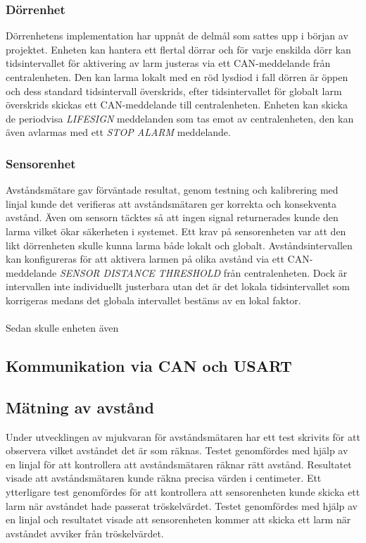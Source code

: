 \documentclass{article}
\begin{document}
\subsubsection{Dörrenhet}
Dörrenhetens implementation har uppnåt de delmål som sattes upp i början av projektet. Enheten kan hantera ett flertal dörrar och för varje enskilda dörr kan tidsintervallet för aktivering av larm justeras via ett CAN-meddelande från centralenheten. Den kan larma lokalt med en röd lysdiod i fall dörren är öppen och dess standard tidsintervall överskrids, efter tidsintervallet för globalt larm överskrids skickas ett CAN-meddelande till centralenheten. Enheten kan skicka de periodvisa \emph{LIFESIGN} meddelanden som tas emot av centralenheten, den kan även avlarmas med ett \emph{STOP ALARM} meddelande.

\subsubsection{Sensorenhet}
Avståndsmätare gav förväntade resultat, genom testning och kalibrering med linjal kunde det verifieras att avståndsmätaren ger korrekta och konsekventa avstånd. Även om sensorn täcktes så att ingen signal returnerades kunde den larma vilket ökar säkerheten i systemet. Ett krav på sensorenheten var att den likt dörrenheten skulle kunna larma både lokalt och globalt. Avståndsintervallen kan konfigureras för att aktivera larmen på olika avstånd via ett CAN-meddelande \emph{SENSOR DISTANCE THRESHOLD} från centralenheten. Dock är intervallen inte individuellt justerbara utan det är det lokala tidsintervallet som korrigeras medans det globala intervallet bestäms av en lokal faktor.
\\
\\
Sedan skulle enheten även 

\subsection{Kommunikation via CAN och USART}

\subsection{Mätning av avstånd}
Under utvecklingen av mjukvaran för avståndsmätaren har ett test skrivits för att observera vilket avståndet det är som räknas. 
Testet genomfördes med hjälp av en linjal för att kontrollera att avståndsmätaren räknar rätt avstånd. 
Resultatet visade att avståndsmätaren kunde räkna precisa värden i centimeter. 
Ett ytterligare test genomfördes för att kontrollera att sensorenheten kunde skicka ett larm när avståndet hade passerat tröskelvärdet. 
Testet genomfördes med hjälp av en linjal och resultatet visade att sensorenheten kommer att skicka ett larm när avståndet avviker från tröskelvärdet.
\end{document}
